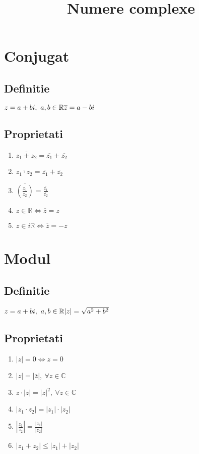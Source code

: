 \documentclass{article}
\title{Numere complexe}
\date{}
\author{}
\begin{document}
\maketitle
\section{Conjugat}

\subsection{Definitie}
$
    z = a+bi,\  a,b \in\mathbb{R}
    \\*
    \overline{z} = a-bi
$

\subsection{Proprietati}
\begin{enumerate}
    \item $ \overline{z_1+z_2} = \overline{z_1} + \overline{z_2}$
    \item $ \overline{z_1\cdot z_2} = \overline{z_1} + \overline{z_2}$
    \item $ \overline{(\frac{z_1}{z_2})} = \frac{\overline{z_1}}{\overline{z_2}}$
    \item $ z \in \mathbb{R} \Leftrightarrow \overline{z}=z$
    \item $ z \in i\mathbb{R} \Leftrightarrow \overline{z}=-z$
\end{enumerate}

\section{Modul}

\subsection{Definitie}
$
    z = a+bi,\  a,b \in \mathbb{R}
    \\*
    |z| = \sqrt{a^2+b^2}
$

\subsection{Proprietati}
\begin{enumerate}
    \item $ |z| = 0 \Leftrightarrow z=0$
    \item $ |z| = |\overline{z}|,\  \forall z \in \mathbb{C}$
    \item $ z \cdot |z| = |z|^2,\  \forall z \in \mathbb{C}$
    \item $ |z_1 \cdot z_2| = |z_1| \cdot |z_2|$
    \item $ |\frac{z_1}{z_2}| = \frac{|z_1|}{|z_2|} $
    \item $ |z_1 + z_2| \leq |z_1| + |z_2|$
\end{enumerate}
\end{document}
